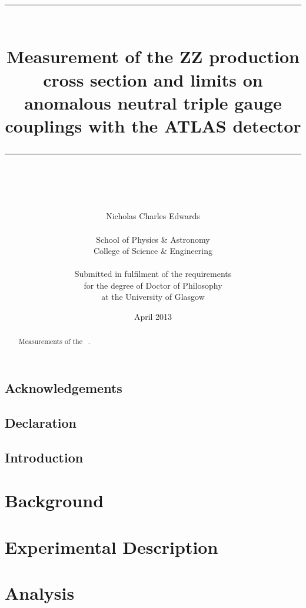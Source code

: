\documentclass[a4paper,12pt]{report}
\title{\rule{14cm}{1mm} \\ Measurement of the ZZ production cross section and
limits on anomalous neutral triple gauge couplings with the ATLAS detector \rule{14cm}{1mm} \\ }
\date{April 2013}
\author{Nicholas Charles Edwards \\ \bigskip \\ \large School of Physics \& Astronomy \\ \large College of Science \& Engineering \\ \bigskip \\ Submitted in fulfilment of the requirements \\ for the degree of Doctor of Philosophy \\ at the University of Glasgow}
\begin{document}
\maketitle

\begin{abstract}
Measurements of the \ZZ\ \cx.
\end{abstract}

\chapter*{Acknowledgements}

\chapter*{Declaration}

\tableofcontents
\listoffigures
\listoftables


\chapter*{Introduction}


\part{Background}





\part{Experimental Description}




%

\part{Analysis}












%


\end{document}
